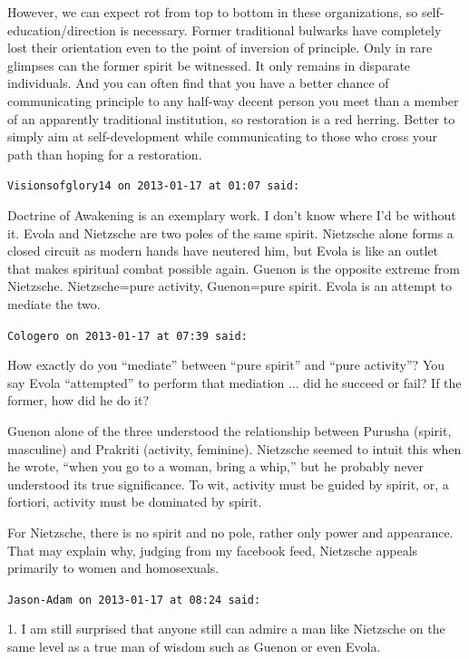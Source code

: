 \begin{footnotesize}
\begin{sffamily}
However, we can expect rot from top to bottom in these organizations, so self-education/direction is necessary. Former traditional bulwarks have completely lost their orientation even to the point of inversion of principle. Only in rare glimpses can the former spirit be witnessed. It only remains in disparate individuals. And you can often find that you have a better chance of communicating principle to any half-way decent person you meet than a member of an apparently traditional institution, so restoration is a red herring. Better to simply aim at self-development while communicating to those who cross your path than hoping for a restoration.

\hfill

\texttt{Visionsofglory14 on 2013-01-17 at 01:07 said:}

Doctrine of Awakening is an exemplary work. I don't know where I'd be without it. Evola and Nietzsche are two poles of the same spirit. Nietzsche alone forms a closed circuit as modern hands have neutered him, but Evola is like an outlet that makes spiritual combat possible again. Guenon is the opposite extreme from Nietzsche. Nietzsche=pure activity, Guenon=pure spirit. Evola is an attempt to mediate the two.

\hfill

\texttt{Cologero on 2013-01-17 at 07:39 said:}

How exactly do you ``mediate'' between ``pure spirit'' and ``pure activity''? You say Evola ``attempted'' to perform that mediation ... did he succeed or fail? If the former, how did he do it?


Guenon alone of the three understood the relationship between Purusha (spirit, masculine) and Prakriti (activity, feminine). Nietzsche seemed to intuit this when he wrote, ``when you go to a woman, bring a whip,'' but he probably never understood its true significance. To wit, activity must be guided by spirit, or, a fortiori, activity must be dominated by spirit.

For Nietzsche, there is no spirit and no pole, rather only power and appearance. That may explain why, judging from my facebook feed, Nietzsche appeals primarily to women and homosexuals.

\hfill

\texttt{Jason-Adam on 2013-01-17 at 08:24 said:}

1. I am still surprised that anyone still can admire a man like Nietzsche on the same level as a true man of wisdom such as Guenon or even Evola.


\end{sffamily}
\end{footnotesize}

